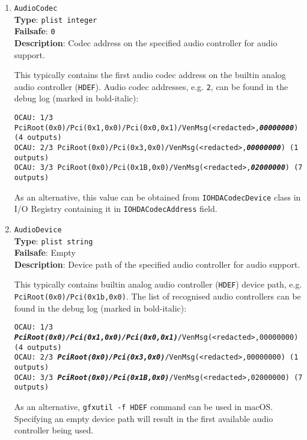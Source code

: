 \documentclass[]{article}
\begin{document}
\begin{enumerate}

\item
  \texttt{AudioCodec}\\
  \textbf{Type}: \texttt{plist\ integer}\\
  \textbf{Failsafe}: \texttt{0}\\
  \textbf{Description}: Codec address on the specified audio controller for audio support.

  This typically contains the first audio codec address on the builtin analog audio controller (\texttt{HDEF}).
  Audio codec addresses, e.g. \texttt{2}, can be found in the debug log (marked in bold-italic):

  \texttt{OCAU: 1/3 PciRoot(0x0)/Pci(0x1,0x0)/Pci(0x0,0x1)/VenMsg(<redacted>,\textit{\textbf{00000000}}) (4 outputs)}\\
  \texttt{OCAU: 2/3 PciRoot(0x0)/Pci(0x3,0x0)/VenMsg(<redacted>,\textit{\textbf{00000000}}) (1 outputs)}\\
  \texttt{OCAU: 3/3 PciRoot(0x0)/Pci(0x1B,0x0)/VenMsg(<redacted>,\textit{\textbf{02000000}}) (7 outputs)}

  As an alternative, this value can be obtained from \texttt{IOHDACodecDevice} class in I/O Registry
  containing it in \texttt{IOHDACodecAddress} field.

\item
  \texttt{AudioDevice}\\
  \textbf{Type}: \texttt{plist\ string}\\
  \textbf{Failsafe}: Empty\\
  \textbf{Description}: Device path of the specified audio controller for audio support.

  This typically contains builtin analog audio controller (\texttt{HDEF}) device path,
  e.g. \texttt{PciRoot(0x0)/Pci(0x1b,0x0)}. The list of recognised audio controllers can be
  found in the debug log (marked in bold-italic):

  \texttt{OCAU: 1/3 \textit{\textbf{PciRoot(0x0)/Pci(0x1,0x0)/Pci(0x0,0x1)}}/VenMsg(<redacted>,00000000) (4 outputs)}\\
  \texttt{OCAU: 2/3 \textit{\textbf{PciRoot(0x0)/Pci(0x3,0x0)}}/VenMsg(<redacted>,00000000) (1 outputs)}\\
  \texttt{OCAU: 3/3 \textit{\textbf{PciRoot(0x0)/Pci(0x1B,0x0)}}/VenMsg(<redacted>,02000000) (7 outputs)}

  As an alternative, \texttt{gfxutil -f HDEF} command can be used in macOS. Specifying an empty device
  path will result in the first available audio controller being used.


\end{enumerate}
\end{document}
